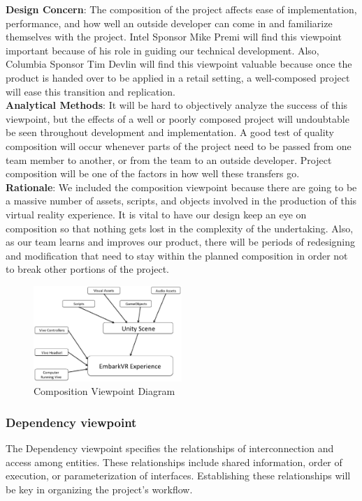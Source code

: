 \documentclass[10pt,journal,compsoc,onecolumn, draftclsnofoot]{IEEEtran}
\begin{document}
\hangindent=0.5cm \textbf{Design Concern}: The composition of the project affects ease of implementation, performance, and how well an outside developer can come in
and familiarize themselves with the project. Intel Sponsor Mike Premi will
find this viewpoint important because of his role in guiding our technical
development. Also, Columbia Sponsor Tim Devlin will find this viewpoint
valuable because once the product is handed over to be applied in a retail
setting, a well-composed project will ease this transition and replication.\\

\hangindent=0.5cm \textbf{Analytical Methods}: It will be hard to objectively analyze the success of this viewpoint, but the effects of a well or poorly composed project will
undoubtable be seen throughout development and implementation. A good test of
quality composition will occur whenever parts of the project need to be
passed from one team member to another, or from the team to an outside
developer. Project composition will be one of the factors in how well these
transfers go.\\

\hangindent=0.5cm \textbf{Rationale}: We included the composition viewpoint because there are going to be a massive number of assets, scripts, and objects involved in the
production of this virtual reality experience. It is vital to have our design
keep an eye on composition so that nothing gets lost in the complexity of the
undertaking. Also, as our team learns and improves our product, there will be
periods of redesigning and modification that need to stay within the planned
composition in order not to break other portions of the project.

\begin{figure}[h]
\centering
\caption{Composition Viewpoint Diagram}
\includegraphics[width=0.5\textwidth]{projectComposition.eps}
\end{figure}
\subsubsection{Dependency viewpoint}
The Dependency viewpoint specifies the relationships of interconnection and access among entities. These relationships include shared information, order of execution, or parameterization of interfaces. Establishing these relationships will be key in organizing the project's workflow.\\
\end{document}
